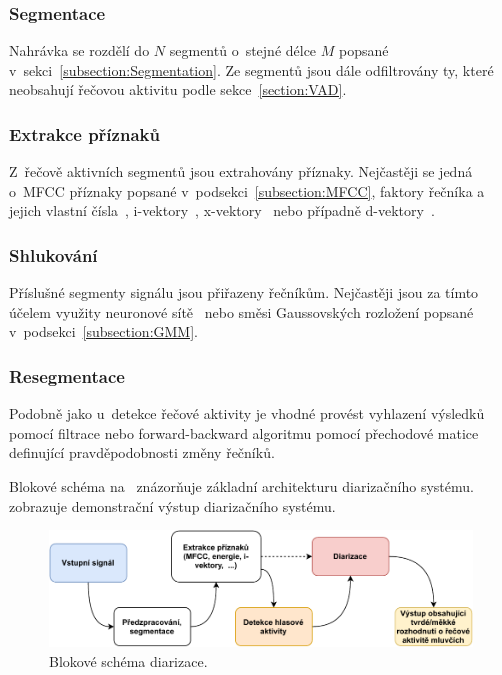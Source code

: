 \subsubsection{Segmentace} 
Nahrávka se rozdělí do $N$ segmentů o~stejné délce $M$ popsané v~sekci~\ref{subsection:Segmentation}. Ze segmentů jsou dále odfiltrovány ty, které neobsahují řečovou aktivitu podle sekce~\ref{section:VAD}.

\subsubsection{Extrakce příznaků}  
Z~řečově aktivních segmentů jsou extrahovány příznaky. Nejčastěji se jedná o~MFCC příznaky popsané v~podsekci~\ref{subsection:MFCC}, faktory řečníka a jejich vlastní čísla~\cite{Speaker_factors}, i-vektory~\cite{Dehak_i_vectors}, x-vektory~\cite{Snyder_x_vectors} nebo případně d-vektory~\cite{Wang_d_vectors}.

\subsubsection{Shlukování}
Příslušné segmenty signálu jsou přiřazeny řečníkům. Nejčastěji jsou za tímto účelem využity neuronové sítě~\cite{Bishop_pattern} nebo směsi Gaussovských rozložení popsané v~podsekci~\ref{subsection:GMM}.

\subsubsection{Resegmentace}
Podobně jako u~detekce řečové aktivity je vhodné provést vyhlazení výsledků pomocí filtrace nebo forward-backward algoritmu pomocí přechodové matice definující pravděpodobnosti změny řečníků. 

Blokové schéma na~ znázorňuje základní architekturu diarizačního systému.  zobrazuje demonstrační výstup diarizačního systému. 

\begin{figure}[ht]
  \centering
  \includegraphics[width=\linewidth]{obrazky-figures/diarization_diagram.pdf}
  \caption{Blokové schéma diarizace.}
  \label{fig:Diar_schema}
\end{figure}


